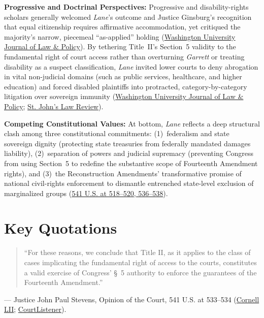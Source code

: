 \documentclass[12pt]{article}
\begin{document}
\textbf{Progressive and Doctrinal Perspectives:} Progressive and disability-rights scholars generally welcomed \textit{Lane}'s outcome and Justice Ginsburg's recognition that equal citizenship requires affirmative accommodation, yet critiqued the majority's narrow, piecemeal ``as-applied'' holding (\href{http://openscholarship.wustl.edu/cgi/viewcontent.cgi?article=1332&context=law_journal_law_policy}{Washington University Journal of Law \& Policy}). By tethering Title~II's Section~5 validity to the fundamental right of court access rather than overturning \textit{Garrett} or treating disability as a suspect classification, \textit{Lane} invited lower courts to deny abrogation in vital non-judicial domains (such as public services, healthcare, and higher education) and forced disabled plaintiffs into protracted, category-by-category litigation over sovereign immunity (\href{http://openscholarship.wustl.edu/cgi/viewcontent.cgi?article=1332&context=law_journal_law_policy}{Washington University Journal of Law \& Policy}; \href{https://scholarship.law.stjohns.edu/cgi/viewcontent.cgi?article=1203&context=lawreview}{St. John's Law Review}).

\textbf{Competing Constitutional Values:} At bottom, \textit{Lane} reflects a deep structural clash among three constitutional commitments: (1)~federalism and state sovereign dignity (protecting state treasuries from federally mandated damages liability), (2)~separation of powers and judicial supremacy (preventing Congress from using Section~5 to redefine the substantive scope of Fourteenth Amendment rights), and (3)~the Reconstruction Amendments' transformative promise of national civil-rights enforcement to dismantle entrenched state-level exclusion of marginalized groups (\href{https://www.law.cornell.edu/supremecourt/text/541/509}{541 U.S. at 518--520, 536--538}).

\section{Key Quotations}
\begin{quote}
``For these reasons, we conclude that Title II, as it applies to the class of cases implicating the fundamental right of access to the courts, constitutes a valid exercise of Congress' \S~5 authority to enforce the guarantees of the Fourteenth Amendment.''
\end{quote}
\noindent --- Justice John Paul Stevens, Opinion of the Court, 541 U.S. at 533--534 (\href{https://www.law.cornell.edu/supremecourt/text/541/509}{Cornell LII}; \href{https://www.courtlistener.com/opinion/134743/tennessee-v-lane/}{CourtListener}).
\end{document}
